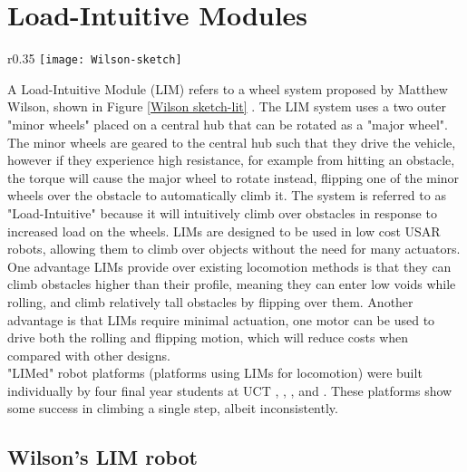 \section{Load-Intuitive Modules} %

\begin{wrapfigure}{r}{0.35\textwidth} %
	\centering
	\texttt{[image: Wilson-sketch]}
	\caption{Systems layout of Wilson's LIM device \citep{Wilson-2013}.}
	\label{Wilson sketch-lit}
\end{wrapfigure}

A Load-Intuitive Module (LIM) refers to a wheel system proposed by Matthew Wilson, shown in Figure \ref{Wilson sketch-lit} \citep{Wilson-2013}. The LIM system uses a two outer "minor wheels" placed on a central hub that can be rotated as a "major wheel". The minor wheels are geared to the central hub such that they drive the vehicle, however if they experience high resistance, for example from hitting an obstacle, the torque will cause the major wheel to rotate instead, flipping one of the minor wheels over the obstacle to automatically climb it. The system is referred to as "Load-Intuitive" because it will intuitively climb over obstacles in response to increased load on the wheels. LIMs are designed to be used in low cost USAR robots, allowing them to climb over objects without the need for many actuators.\\

One advantage LIMs provide over existing locomotion methods is that they can climb obstacles higher than their profile, meaning they can enter low voids while rolling, and climb relatively tall obstacles by flipping over them. Another advantage is that LIMs require minimal actuation, one motor can be used to drive both the rolling and flipping motion, which will reduce costs when compared with other designs.\\

\noindent "LIMed" robot platforms (platforms using LIMs for locomotion) were built individually by four final year students at UCT \citep{Wilson-2013}, \citep{Haskel-2017}, \citep{Buchanan-2018}, and \citep{Powrie-2019}. These platforms show some success in climbing a single step, albeit inconsistently.

\subsection{Wilson's LIM robot} %

